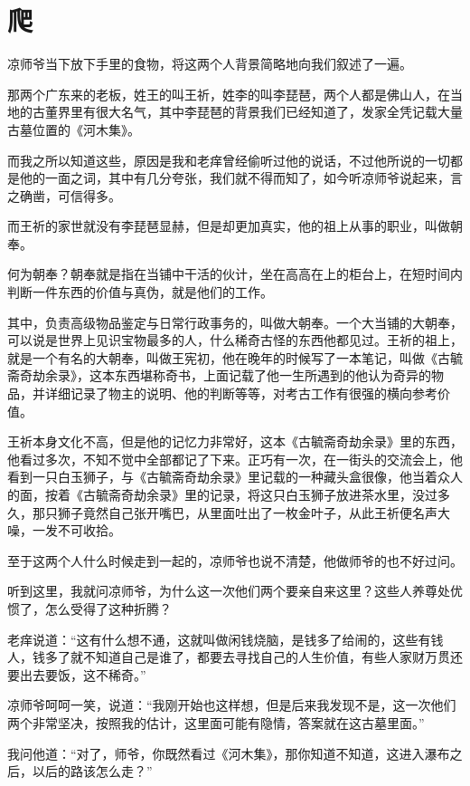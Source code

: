 \chapter{爬}

凉师爷当下放下手里的食物，将这两个人背景简略地向我们叙述了一遍。

那两个广东来的老板，姓王的叫王祈，姓李的叫李琵琶，两个人都是佛山人，在当地的古董界里有很大名气，其中李琵琶的背景我们已经知道了，发家全凭记载大量古墓位置的《河木集》。

而我之所以知道这些，原因是我和老痒曾经偷听过他的说话，不过他所说的一切都是他的一面之词，其中有几分夸张，我们就不得而知了，如今听凉师爷说起来，言之确凿，可信得多。

而王祈的家世就没有李琵琶显赫，但是却更加真实，他的祖上从事的职业，叫做朝奉。

何为朝奉？朝奉就是指在当铺中干活的伙计，坐在高高在上的柜台上，在短时间内判断一件东西的价值与真伪，就是他们的工作。

其中，负责高级物品鉴定与日常行政事务的，叫做大朝奉。一个大当铺的大朝奉，可以说是世界上见识宝物最多的人，什么稀奇古怪的东西他都见过。王祈的祖上，就是一个有名的大朝奉，叫做王宪初，他在晚年的时候写了一本笔记，叫做《古毓斋奇劫余录》，这本东西堪称奇书，上面记载了他一生所遇到的他认为奇异的物品，并详细记录了物主的说明、他的判断等等，对考古工作有很强的横向参考价值。

王祈本身文化不高，但是他的记忆力非常好，这本《古毓斋奇劫余录》里的东西，他看过多次，不知不觉中全部都记了下来。正巧有一次，在一街头的交流会上，他看到一只白玉狮子，与《古毓斋奇劫余录》里记载的一种藏头盒很像，他当着众人的面，按着《古毓斋奇劫余录》里的记录，将这只白玉狮子放进茶水里，没过多久，那只狮子竟然自己张开嘴巴，从里面吐出了一枚金叶子，从此王祈便名声大噪，一发不可收拾。

至于这两个人什么时候走到一起的，凉师爷也说不清楚，他做师爷的也不好过问。

听到这里，我就问凉师爷，为什么这一次他们两个要亲自来这里？这些人养尊处优惯了，怎么受得了这种折腾？

老痒说道：“这有什么想不通，这就叫做闲钱烧脑，是钱多了给闹的，这些有钱人，钱多了就不知道自己是谁了，都要去寻找自己的人生价值，有些人家财万贯还要出去要饭，这不稀奇。”

凉师爷呵呵一笑，说道：“我刚开始也这样想，但是后来我发现不是，这一次他们两个非常坚决，按照我的估计，这里面可能有隐情，答案就在这古墓里面。”

我问他道：“对了，师爷，你既然看过《河木集》，那你知道不知道，这进入瀑布之后，以后的路该怎么走？”

